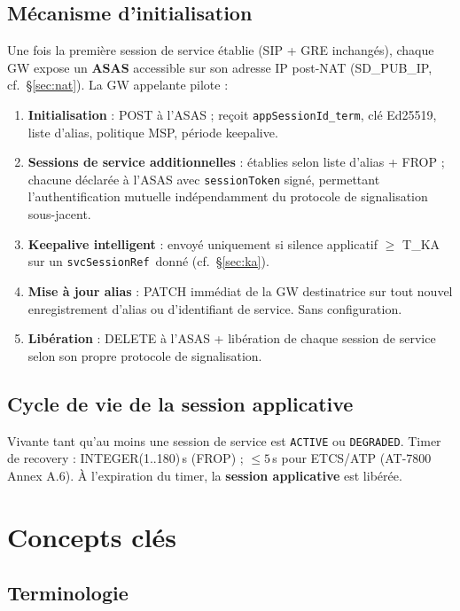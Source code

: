 \documentclass[11pt,a4paper]{article}
\newcommand{\svcref}{\texttt{svcSessionRef}}
\newcommand{\appterm}{\texttt{appSessionId\_term}}
\begin{document}
\subsection{Mécanisme d'initialisation}

Une fois la première session de service établie (SIP + GRE inchangés), chaque GW
expose un \textbf{ASAS} accessible sur son adresse IP post-NAT (SD\_PUB\_IP,
cf.\ §\ref{sec:nat}). La GW appelante pilote :

\begin{enumerate}[leftmargin=2em]
  \item \textbf{Initialisation} : POST à l'ASAS ; reçoit \appterm, clé Ed25519,
    liste d'alias, politique MSP, période keepalive.
  \item \textbf{Sessions de service additionnelles} : établies selon liste d'alias +
    FROP ; chacune déclarée à l'ASAS avec \texttt{sessionToken} signé, permettant
    l'authentification mutuelle indépendamment du protocole de signalisation
    sous-jacent.
  \item \textbf{Keepalive intelligent} : envoyé uniquement si silence applicatif
    $\geq$ T\_KA sur un \svcref\ donné (cf.\ §\ref{sec:ka}).
  \item \textbf{Mise à jour alias} : PATCH immédiat de la GW destinatrice sur tout
    nouvel enregistrement d'alias ou d'identifiant de service. Sans configuration.
  \item \textbf{Libération} : DELETE à l'ASAS + libération de chaque session de
    service selon son propre protocole de signalisation.
\end{enumerate}

\subsection{Cycle de vie de la session applicative}

Vivante tant qu'au moins une session de service est \texttt{ACTIVE} ou
\texttt{DEGRADED}. Timer de recovery : INTEGER(1..180)\,s (FROP) ;
$\leq 5$\,s pour ETCS/ATP (AT-7800 Annex A.6).
À l'expiration du timer, la \textbf{session applicative} est libérée.

\section{Concepts clés}

\subsection{Terminologie}
\end{document}
